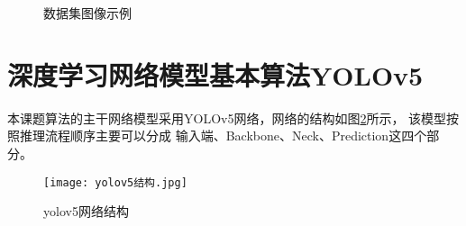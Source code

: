 \begin{figure}[!h]
    \setlength{\subfigcapskip}{-1bp}

    \centering
    \begin{minipage}{\textwidth}
    \centering
    \subfigure{\label{dataset11}}\addtocounter{subfigure}{-2}
    \hspace{2em}
    \subfigure{\label{dataset12}}\addtocounter{subfigure}{-2}
    \end{minipage}

    \centering
    \begin{minipage}{\textwidth}
    \centering
    \subfigure{\label{dataset21}}\addtocounter{subfigure}{-2}
    \hspace{2em}
    \subfigure{\label{dataset22}}\addtocounter{subfigure}{-2}
    \end{minipage}

    \centering
    \begin{minipage}{\textwidth}
    \centering
    \subfigure{\label{dataset31}}\addtocounter{subfigure}{-2}
    \hspace{2em}
    \subfigure{\label{dataset32}}\addtocounter{subfigure}{-2}
    \end{minipage}

    \vspace{0.2em}
    \caption{数据集图像示例}
    {\label{dataset}}
\end{figure}


\section{深度学习网络模型基本算法YOLOv5}
本课题算法的主干网络模型采用YOLOv5网络，网络的结构如图\ref{yolo1}所示，
该模型按照推理流程顺序主要可以分成
输入端、Backbone、Neck、Prediction这四个部分。

\begin{figure}[h]
    \centering
    \texttt{[image: yolov5结构.jpg]}
    \caption{yolov5网络结构}
    \label{yolo1}
\end{figure}


